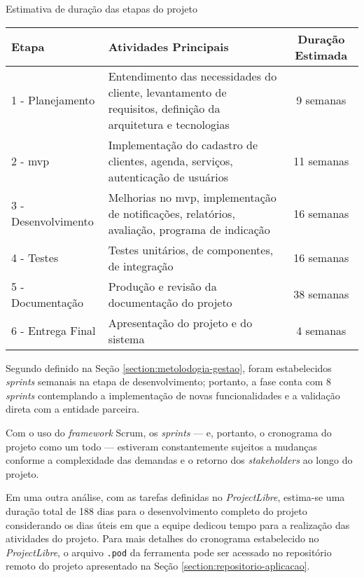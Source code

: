 \begin{quadro}[ht]
	\setlength{\tabcolsep}{5pt}
	\begin{center}
		\renewcommand{\arraystretch}{1.12} 	%
		\setlength{\tabcolsep}{4pt}      	%
		\caption{\label{frame:etapas-estimativa}Estimativa de duração das etapas do projeto}
		\begin{tabular}{|m{4cm}|m{7cm}|c|}
			\hline
			\centering\textbf{Etapa} & \centering\textbf{Atividades Principais} & \textbf{Duração Estimada} \\
			\hline
			1 - Planejamento & Entendimento das necessidades do cliente, levantamento de requisitos, definição da arquitetura e tecnologias  & 9 semanas \\
			\hline
			2 - \gls{mvp} & Implementação do cadastro de clientes, agenda, serviços, autenticação de usuários & 11 semanas \\
			\hline
			3 - Desenvolvimento & Melhorias no \gls{mvp}, implementação de notificações, relatórios, avaliação, programa de indicação  & 16 semanas \\
			\hline
			4 - Testes & Testes unitários, de componentes, de integração  & 16 semanas \\
			\hline
			5 - Documentação & Produção e revisão da documentação do projeto & 38 semanas \\
			\hline
			6 - Entrega Final & Apresentação do projeto e do sistema &  4 semanas \\
			\hline
		\end{tabular}
	\end{center}
\end{quadro}

Segundo definido na Seção \ref{section:metolodogia-gestao}, foram estabelecidos \textit{sprints} semanais na etapa de desenvolvimento; portanto, a fase conta com 8 \textit{sprints} contemplando a implementação de novas funcionalidades e a validação direta com a entidade parceira.

Com o uso do \textit{framework} Scrum, os \textit{sprints} --- e, portanto, o cronograma do projeto como um todo --- estiveram constantemente sujeitos a mudanças conforme a complexidade das demandas e o retorno dos \textit{stakeholders} ao longo do projeto.

Em uma outra análise, com as tarefas definidas no \emph{ProjectLibre}, estima-se uma duração total de 188 dias para o desenvolvimento completo do projeto considerando os dias úteis em que a equipe dedicou tempo para a realização das atividades do projeto. Para mais detalhes do cronograma estabelecido no \emph{ProjectLibre}, o arquivo \texttt{.pod} da ferramenta pode ser acessado no repositório remoto do projeto  apresentado na Seção \ref{section:repositorio-aplicacao}.